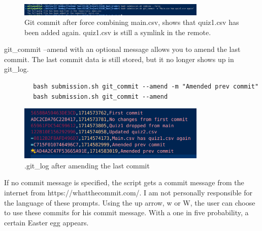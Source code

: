 \documentclass{article}
\begin{document}
    \begin{figure}[htbp]
        \centering
        \includegraphics[width=0.8\textwidth]{Git commit after maincsv has quiz1 again.png}
        \caption{Git commit after force combining main.csv, shows that quiz1.csv has been added again. quiz1.csv is still a symlink in the remote.}
        \label{fig:fourth_commit}
    \end{figure}

    git\_commit --amend with an optional message allows you to amend the last commit. The last commit data is still stored, but it no longer shows up in git\_log.\\
    \begin{lstlisting}
        bash submission.sh git_commit --amend -m "Amended prev commit"
        bash submission.sh git_commit --amend
    \end{lstlisting}
    \begin{figure}[htbp]
        \centering
        \includegraphics[width=0.8\textwidth]{commit_amend.png}
        \caption{.git\_log after amending the last commit}
        \label{fig:amend_commit}
    \end{figure}

    If no commit message is specified, the script gets a commit message from the internet from https://whatthecommit.com/. I am not personally responsible for the language of these prompts. Using the up arrow, w or W, the user can choose to use these commits for his commit message. With a one in five probability, a certain Easter egg appears.\\
\end{document}
